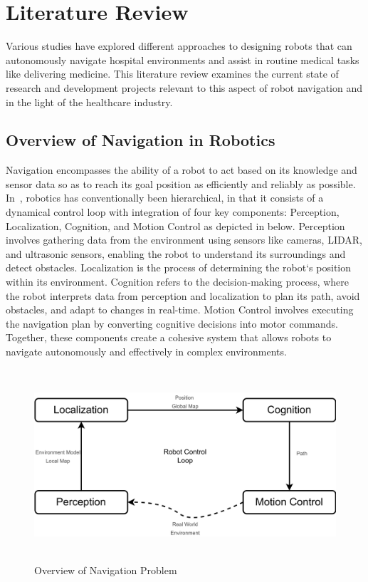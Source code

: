 \newpage

\section{Literature Review}
Various studies have explored different approaches to designing robots that can autonomously navigate
hospital environments and assist in routine medical tasks like delivering medicine. This literature review
examines the current state of research and development projects relevant to this aspect of robot navigation
and in the light of the healthcare industry. 



\subsection{Overview of Navigation in Robotics}
\noindent Navigation encompasses the ability of a robot to act based on its knowledge and sensor data so as to reach its goal
position as efficiently and reliably as possible. In~\cite{ozkil2009navigation}, robotics has conventionally been
hierarchical, in that it consists of a dynamical control loop with integration of four key components: Perception, Localization, Cognition, and Motion
Control as depicted in  below. Perception involves gathering data from the environment using sensors like cameras, LIDAR, and ultrasonic sensors,
enabling the robot to understand its surroundings and detect obstacles. Localization is the process of determining the 
robot`s position within its environment. Cognition refers to the decision-making process, where the robot interprets data from perception
and localization to plan its path, avoid obstacles, and adapt to changes in real-time. Motion Control involves
executing the navigation plan by converting cognitive decisions into motor commands. Together, these components create
a cohesive system that allows robots to navigate autonomously and effectively in complex environments.

\vspace{1.0em}

\begin{figure}[H]
    \centering
    \includegraphics[width=4.6in, height=2.8in]{pics/navigation_overview.png}
    \caption[Overview of Navigation Problem]{Overview of Navigation Problem~\cite{ozkil2009navigation}}\label{nav_overview}
\end{figure}



